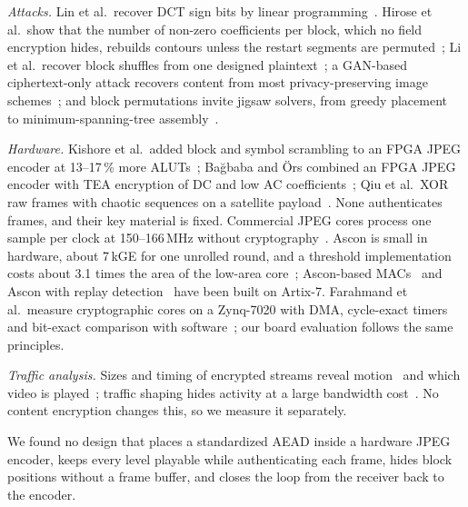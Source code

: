 \textit{Attacks.} Lin et al.\ recover DCT sign bits by linear programming~\cite{lin2024}. Hirose et al.\ show that the number of non-zero coefficients per block, which no field encryption hides, rebuilds contours unless the restart segments are permuted~\cite{hirose2024}; Li et al.\ recover block shuffles from one designed plaintext~\cite{li2025shuffle}; a GAN-based ciphertext-only attack recovers content from most privacy-preserving image schemes~\cite{sirichotedumrong2020}; and block permutations invite jigsaw solvers, from greedy placement~\cite{pomeranz2011} to minimum-spanning-tree assembly~\cite{gallagher2012}.

\textit{Hardware.} Kishore et al.\ added block and symbol scrambling to an FPGA JPEG encoder at 13--17\,\% more ALUTs~\cite{kishore2015}; Ba\u{g}baba and \"Ors combined an FPGA JPEG encoder with TEA encryption of DC and low AC coefficients~\cite{bagbaba2015}; Qiu et al.\ XOR raw frames with chaotic sequences on a satellite payload~\cite{qiu2025}. None authenticates frames, and their key material is fixed. Commercial JPEG cores process one sample per clock at 150--166\,MHz without cryptography~\cite{logijpge,castjpeg}. Ascon is small in hardware, about 7\,kGE for one unrolled round, and a threshold implementation costs about 3.1 times the area of the low-area core~\cite{gross2017}; Ascon-based MACs~\cite{khairallah2023} and Ascon with replay detection~\cite{kurian2025} have been built on Artix-7. Farahmand et al.\ measure cryptographic cores on a Zynq-7020 with DMA, cycle-exact timers and bit-exact comparison with software~\cite{farahmand2016}; our board evaluation follows the same principles.

\textit{Traffic analysis.} Sizes and timing of encrypted streams reveal motion~\cite{wampler2015} and which video is played~\cite{schuster2017}; traffic shaping hides activity at a large bandwidth cost~\cite{apthorpe2019}. No content encryption changes this, so we measure it separately.

We found no design that places a standardized AEAD inside a hardware JPEG encoder, keeps every level playable while authenticating each frame, hides block positions without a frame buffer, and closes the loop from the receiver back to the encoder.
